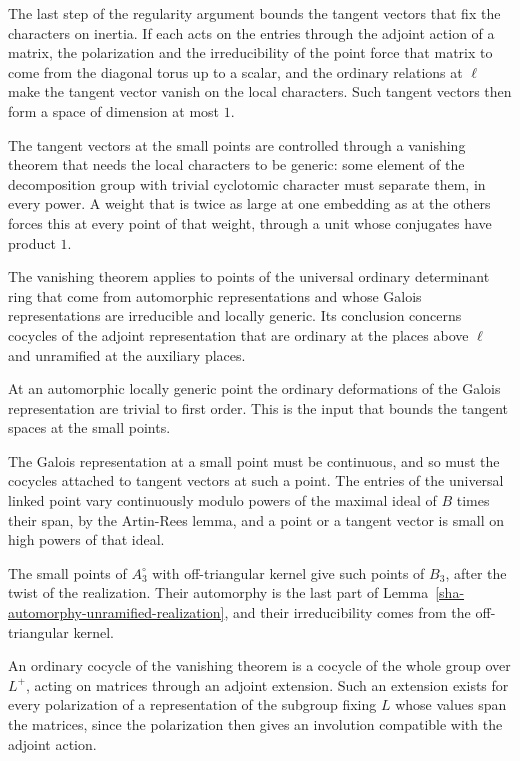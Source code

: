 The last step of the regularity argument bounds the tangent vectors that fix the characters on inertia. If each acts on the entries through the adjoint action of a matrix, the polarization and the irreducibility of the point force that matrix to come from the diagonal torus up to a scalar, and the ordinary relations at $\ell$ make the tangent vector vanish on the local characters. Such tangent vectors then form a space of dimension at most $1$.

The tangent vectors at the small points are controlled through a vanishing theorem that needs the local characters to be generic: some element of the decomposition group with trivial cyclotomic character must separate them, in every power. A weight that is twice as large at one embedding as at the others forces this at every point of that weight, through a unit whose conjugates have product $1$.

The vanishing theorem applies to points of the universal ordinary determinant ring that come from automorphic representations and whose Galois representations are irreducible and locally generic. Its conclusion concerns cocycles of the adjoint representation that are ordinary at the places above $\ell$ and unramified at the auxiliary places.

At an automorphic locally generic point the ordinary deformations of the Galois representation are trivial to first order. This is the input that bounds the tangent spaces at the small points.

The Galois representation at a small point must be continuous, and so must the cocycles attached to tangent vectors at such a point. The entries of the universal linked point vary continuously modulo powers of the maximal ideal of $B$ times their span, by the Artin-Rees lemma, and a point or a tangent vector is small on high powers of that ideal.

The small points of $A_3^\circ$ with off-triangular kernel give such points of $B_3$, after the twist of the realization. Their automorphy is the last part of Lemma~\ref{sha-automorphy-unramified-realization}, and their irreducibility comes from the off-triangular kernel.

An ordinary cocycle of the vanishing theorem is a cocycle of the whole group over $L^+$, acting on matrices through an adjoint extension. Such an extension exists for every polarization of a representation of the subgroup fixing $L$ whose values span the matrices, since the polarization then gives an involution compatible with the adjoint action.

